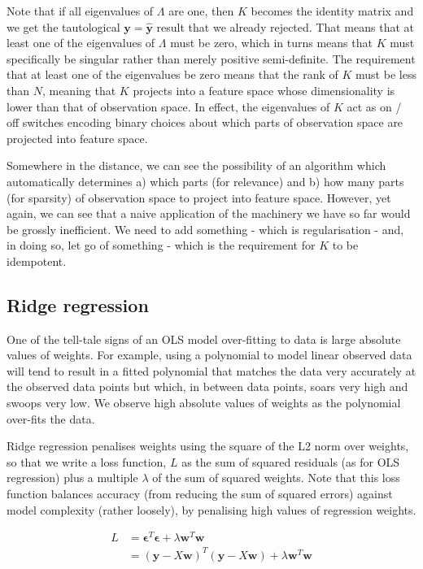 \documentclass[11pt]{article}
\begin{document}
	Note that if all eigenvalues of $\Lambda$ are one, then $K$ becomes the identity matrix and we get the tautological $\boldsymbol{y} = \boldsymbol{\hat{y}}$ result that we already rejected. That means that at least one of the eigenvalues of $\Lambda$ must be zero, which in turns means that $K$ must specifically be singular rather than merely positive semi-definite. The requirement that at least one of the eigenvalues be zero means that the rank of $K$ must be less than $N$, meaning that $K$ projects into a feature space whose dimensionality is lower than that of observation space. In effect, the eigenvalues of $K$ act as on / off switches encoding binary choices about which parts of observation space are projected into feature space.
	
	Somewhere in the distance, we can see the possibility of an algorithm which automatically determines a) which parts (for relevance) and b) how many parts (for sparsity) of observation space to project into feature space. However, yet again, we can see that a naive application of the machinery we have so far would be grossly inefficient. We need to add something - which is regularisation - and, in doing so, let go of something - which is the requirement for $K$ to be idempotent.
	
	\subsection{Ridge regression}
	
	One of the tell-tale signs of an OLS model over-fitting to data is large absolute values of weights. For example, using a polynomial to model linear observed data will tend to result in a fitted polynomial that matches the data very accurately at the observed data points but which, in between data points, soars very high and swoops very low. We observe high absolute values of weights as the polynomial over-fits the data.
	
	Ridge regression penalises weights using the square of the L2 norm over weights, so that we write a loss function, $L$ as the sum of squared residuals (as for OLS regression) plus a multiple $\lambda$ of the sum of squared weights. Note that this loss function balances accuracy (from reducing the sum of squared errors) against model complexity (rather loosely), by penalising high values of regression weights.
	
	\begin{align*}
		L &= \boldsymbol{\epsilon}^{T}\boldsymbol{\epsilon} + \lambda \boldsymbol{w}^{T}\boldsymbol{w} \\
		&= (\boldsymbol{y} - X\boldsymbol{w})^{T}(\boldsymbol{y} - X\boldsymbol{w}) + \lambda \boldsymbol{w}^{T}\boldsymbol{w}
	\end{align*}
	
\end{document}
